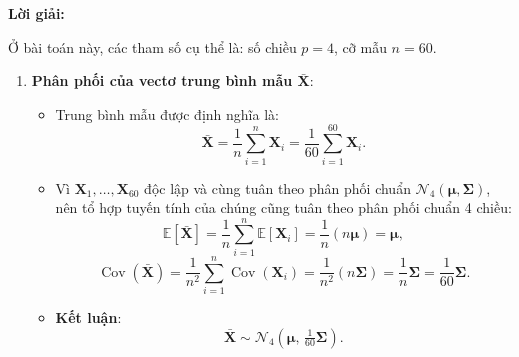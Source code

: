 \documentclass[11pt,a4paper]{article}
\newenvironment{solution}{%
  \par\noindent\textbf{Lời giải:}\ \ignorespaces
}{\par}
\theoremstyle{definition}
\newcommand{\answer}[1]{\boxed{#1}}
\begin{document}
\begin{solution}
Ở bài toán này, các tham số cụ thể là: số chiều $p = 4$, cỡ mẫu $n = 60$.

\begin{enumerate}[label=\textbf{\alph*)}]
  \item \textbf{Phân phối của vectơ trung bình mẫu $\bar{\mathbf{X}}$}:
  \begin{itemize}
    \item Trung bình mẫu được định nghĩa là:
    \[
    \bar{\mathbf{X}} = \frac{1}{n}\sum_{i=1}^{n} \mathbf{X}_i = \frac{1}{60}\sum_{i=1}^{60} \mathbf{X}_i.
    \]
    \item Vì $\mathbf{X}_1, \dots, \mathbf{X}_{60}$ độc lập và cùng tuân theo phân phối chuẩn $\mathcal{N}_4(\boldsymbol{\mu}, \boldsymbol{\Sigma})$, nên tổ hợp tuyến tính của chúng cũng tuân theo phân phối chuẩn 4 chiều:
    \[
    \mathbb{E}[\bar{\mathbf{X}}] = \frac{1}{n}\sum_{i=1}^{n}\mathbb{E}[\mathbf{X}_i] = \frac{1}{n}(n\boldsymbol{\mu}) = \boldsymbol{\mu},
    \]
    \[
    \operatorname{Cov}(\bar{\mathbf{X}}) = \frac{1}{n^2}\sum_{i=1}^{n}\operatorname{Cov}(\mathbf{X}_i) = \frac{1}{n^2}(n\boldsymbol{\Sigma}) = \frac{1}{n}\boldsymbol{\Sigma} = \frac{1}{60}\boldsymbol{\Sigma}.
    \]
    \item \textbf{Kết luận}:
    \[
    \bar{\mathbf{X}} \sim \answer{\mathcal{N}_4\left(\boldsymbol{\mu}, \, \tfrac{1}{60}\boldsymbol{\Sigma}\right)}.
    \]
  \end{itemize}


\end{enumerate}
\end{solution}
\end{document}
